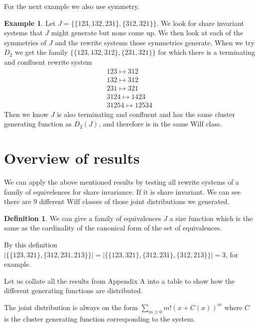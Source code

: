\documentclass[a4paper, 11pt, english]{article}
\newcommand{\patternrule}{ \mapsto \!}
\theoremstyle{definition}
\newtheorem{definition}[theorem]{Definition}
\newtheorem{example}[theorem]{Example}
\begin{document}
For the next example we also use symmetry.

\begin{example}
Let $J = \{\{123, 132, 231\}, \{312, 321\}\}$. We look for share invariant systems that $J$ might
generate but none come up. We then look at each of the symmetries of $J$ and the rewrite systems
those symmetries generate. When we try $D_2$ we get the family $\{ \{ 123, 132, 312 \}, \{ 231, 321
\} \}$ for which there is a terminating and confluent rewrite system
\[
    \begin{matrix}
        123 \patternrule 312 \\
        132 \patternrule 312 \\
        231 \patternrule 321 \\
        3124 \patternrule 1423 \\
        31254 \patternrule 12534
    \end{matrix}
\]
Then we know $J$ is also terminating and confluent and has the same cluster generating function as
$D_2(J)$, and therefore is in the same Wilf class.

\end{example}

\section{Overview of results}
We can apply the above mentioned results by testing all rewrite systems of a
family of equivelences for share invariance. If it is share invariant.
We can see there are 9 different Wilf classes of those joint distributions we
generated.

\begin{definition}
    We can give a family of equivalences $J$ a size function which is the same
    as the cardinality of the canonical form of the set of equivalences.

    By this definition $| \{ \{ 123, 321 \}, \{ 312, 231, 213 \} \}| = | \{ \{
    123, 321 \}, \{ 312, 231 \}, \{ 312, 213 \} \} | = 3$, for example.
\end{definition}

Let us collate all the results from Appendix A into a table to show how the
different generating functions are distributed.

The joint distribution is always on the form $\sum_{m \geq 0}m!(x+C(x))^m$ where $C$
is the cluster generating function corresponding to the system.
\end{document}

